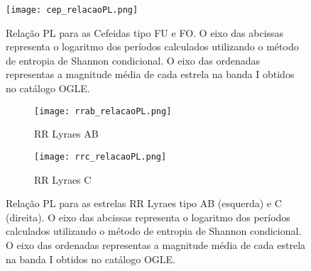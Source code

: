 \begin{figure}[ht]
\centering
\texttt{[image: cep\_relacaoPL.png]}
\caption[Relação PL para Cefeidas.]{Relação PL para as Cefeidas tipo FU e FO. O eixo das abcissas representa o logaritmo dos períodos calculados utilizando o método de entropia de Shannon condicional. O eixo das ordenadas representas a magnitude média de cada estrela na banda I obtidos no catálogo OGLE.}
\label{fig:pl_cep}
\end{figure}
\begin{figure}[!ht]
\centering
\begin{subfigure}{.5\textwidth}
  \centering
  \texttt{[image: rrab\_relacaoPL.png]}
  \caption{RR Lyraes AB}
  \label{fig:ab_pl}
\end{subfigure}%
\begin{subfigure}{.5\textwidth}
  \centering
  \texttt{[image: rrc\_relacaoPL.png]}
  \caption{RR Lyraes C}
  \label{fig:c_pl}
  \end{subfigure}
\caption[Relação PL para RR Lyraes.]{Relação PL para as estrelas RR Lyraes tipo AB (esquerda) e C (direita). O eixo das abcissas representa o logaritmo dos períodos calculados utilizando o método de entropia de Shannon condicional. O eixo das ordenadas representas a magnitude média de cada estrela na banda I obtidos no catálogo OGLE.}
\label{fig:rr_pl}
\end{figure}

